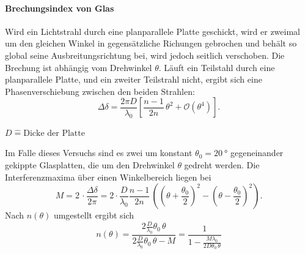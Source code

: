 \paragraph{Brechungsindex von Glas}
Wird ein Lichtstrahl durch eine planparallele Platte geschickt, wird er zweimal um den gleichen Winkel in gegensätzliche Richungen gebrochen und behält so global seine Ausbreitungsrichtung bei, wird jedoch seitlich verschoben.
Die Brechung ist abhängig vom Drehwinkel $\theta$.
Läuft ein Teilstahl durch eine planparallele Platte, und ein zweiter Teilstrahl nicht, ergibt sich eine Phasenverschiebung zwischen den beiden Strahlen:
\begin{equation*}
	\Delta \delta = \frac{2 \pi D}{\lambda_0} \left[ \frac{n-1}{2n} \, \theta^2 + \mathcal{O}(\theta^4) \right].
\end{equation*}
\begin{center}
	\tiny{$D \widehat{=} \text{Dicke der Platte}$}
\end{center}
Im Falle dieses Versuchs sind es zwei um konstant $\theta_0 = \SI{20}{°}$ gegeneinander gekippte Glasplatten, die um den Drehwinkel $\theta$ gedreht werden.
Die Interferenzmaxima über einen Winkelbereich liegen bei
\begin{equation*}
	M = 2 \, \cdot \frac{\Delta \delta}{2 \pi} = 2 \cdot \frac{D}{\lambda_{0}} \frac{n-1}{2n} \,  \left( (\theta+\frac{\theta_0}{2})^2 - (\theta-\frac{\theta_0}{2})^2 \right).
\end{equation*}
Nach $n(\theta)$ umgestellt ergibt sich
\begin{equation}
	n (\theta) = \frac{2 \frac{D}{\lambda_0} \theta_0 \, \theta}{2 \frac{D}{\lambda_0} \theta_0 \, \theta - M} = \frac{1}{1- \frac{M \lambda_0}{2D \theta_0 \, \theta}} \label{eqn:brechungsindex_glas}
\end{equation}
\FloatBarrier
